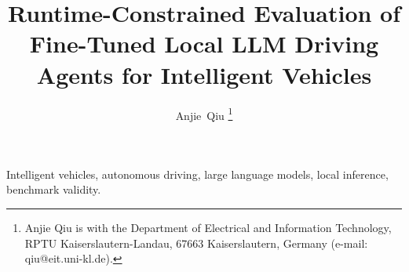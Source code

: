 \documentclass[journal]{IEEEtran}
\title{Runtime-Constrained Evaluation of Fine-Tuned Local LLM Driving Agents for Intelligent Vehicles}
\author{Anjie~Qiu%
\thanks{Anjie Qiu is with the Department of Electrical and Information Technology, RPTU Kaiserslautern-Landau, 67663 Kaiserslautern, Germany (e-mail: qiu@eit.uni-kl.de).}}
\begin{document}
\maketitle

\begin{abstract}

\end{abstract}

\begin{IEEEkeywords}
Intelligent vehicles, autonomous driving, large language models, local inference, benchmark validity.
\end{IEEEkeywords}










\appendices






\end{document}
